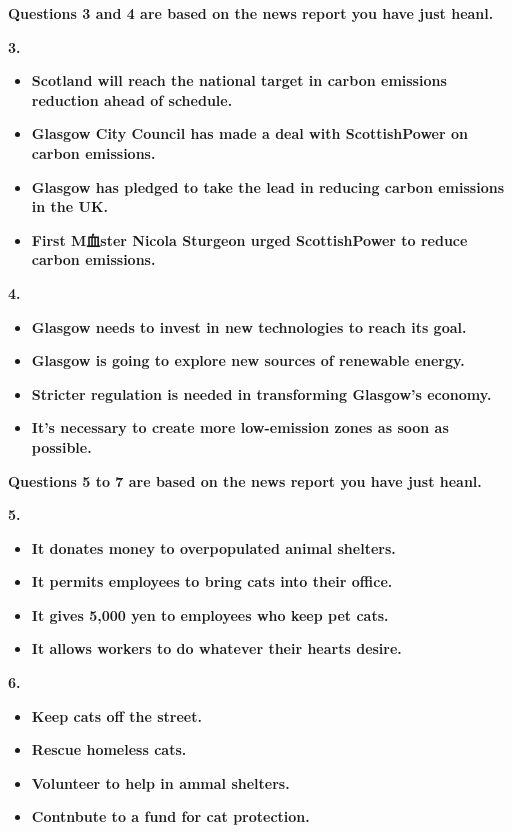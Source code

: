\documentclass[UTF8,11pt]{ctexart}
\begin{document}
\textbf{Questions 3 and 4 are based on the news report you have just heanl.}


\textbf{3.}


\begin{itemize}[leftmargin=2em,itemsep=.2em,topsep=.4em]\item[A.] \textbf{Scotland will reach the national target in carbon emissions reduction ahead of schedule.}
\item[B.] \textbf{Glasgow City Council has made a deal with ScottishPower on carbon emissions.}
\item[C.] \textbf{Glasgow has pledged to take the lead in reducing carbon emissions in the UK.}
\item[D.] \textbf{First M血ster Nicola Sturgeon urged ScottishPower to reduce carbon emissions.}
\end{itemize}

\textbf{4.}


\begin{itemize}[leftmargin=2em,itemsep=.2em,topsep=.4em]\item[A.] \textbf{Glasgow needs to invest in new technologies to reach its goal.}
\item[B.] \textbf{Glasgow is going to explore new sources of renewable energy.}
\item[C.] \textbf{Stricter regulation is needed in transforming Glasgow's economy.}
\item[D.] \textbf{It's necessary to create more low-emission zones as soon as possible.}
\end{itemize}

\textbf{Questions 5 to 7 are based on the news report you have just heanl.}


\textbf{5.}


\begin{itemize}[leftmargin=2em,itemsep=.2em,topsep=.4em]\item[A.] \textbf{It donates money to overpopulated animal shelters.}
\item[B.] \textbf{It permits employees to bring cats into their office.}
\item[C.] \textbf{It gives 5,000 yen to employees who keep pet cats.}
\item[D.] \textbf{It allows workers to do whatever their hearts desire.}
\end{itemize}

\textbf{6.}


\begin{itemize}[leftmargin=2em,itemsep=.2em,topsep=.4em]\item[A.] \textbf{Keep cats off the street.}
\item[B.] \textbf{Rescue homeless cats.}
\item[C.] \textbf{Volunteer to help in ammal shelters.}
\item[D.] \textbf{Contnbute to a fund for cat protection.\textperiodcentered{}}
\end{itemize}
\end{document}
